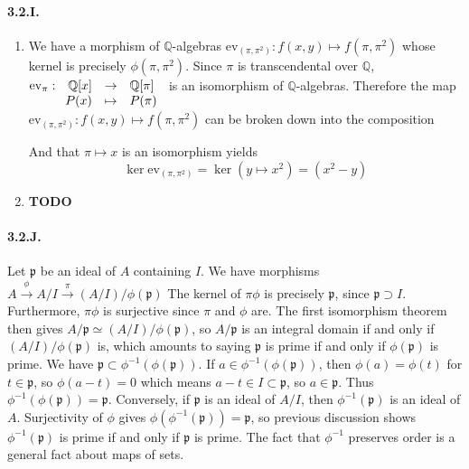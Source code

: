 \documentclass{article}
\newcommand{\ev}{\mathrm{ev}}
\newcommand{\Q}{\mathbb{Q}}
\newcommand{\todo}{\textbf{TODO}}
\newcommand{\applic}[4]{\begin{array}[t]{rcl}
#1 & \to & #2 \\
#3 & \mapsto & #4
\end{array}}
\newcommand{\p}{\mathfrak{p}}
\begin{document}
\paragraph{3.2.I.} 
\begin{enumerate}
    \item We have a morphism of $\Q$-algebras $\mathrm{ev}_{(\pi,\pi^2)} : f(x,y) \mapsto f(\pi,\pi^2)$ whose kernel is precisely $\phi(\pi,\pi^2)$. Since $\pi$ is transcendental over $\Q$, $\mathrm{ev}_\pi : \applic{\Q[x]}{\Q[\pi]}{P(x)}{P(\pi)}$ is an isomorphism of $\Q$-algebras. Therefore the map $\mathrm{ev}_{(\pi,\pi^2)} : f(x,y) \mapsto f(\pi,\pi^2)$ can be broken down into the composition
    \begin{center}
    \end{center}
    And that $\pi \mapsto x$ is an isomorphism yields
    \[\ker \ev_{(\pi,\pi^2)} = \ker (y \mapsto x^2) = (x^2 - y)\]
    \item \todo
\end{enumerate}

\paragraph{3.2.J.} Let $\p$ be an ideal of $A$ containing $I$. We have morphisms
$A \xrightarrow{\phi} A/I \xrightarrow{\pi} (A/I)/\phi(\p)$
The kernel of $\pi\phi$ is precisely $\p$, since $\p \supset I$. Furthermore, $\pi \phi$ is surjective since $\pi$ and $\phi$ are. The first isomorphism theorem then gives $A/\p \simeq (A/I)/\phi(\p)$, so $A/\p$ is an integral domain if and only if $(A/I)/\phi(\p)$ is, which amounts to saying $\p$ is prime if and only if $\phi(\p)$ is prime. We have $\p \subset \phi^{-1}(\phi(\p))$. If $a \in \phi^{-1}(\phi(\p))$, then $\phi(a) = \phi(t)$ for $t \in \p$, so $\phi(a-t) = 0$ which means $a-t \in I \subset \p$, so $a \in \p$. Thus $\phi^{-1}(\phi(\p)) = \p$. Conversely, if $\p$ is an ideal of $A/I$, then $\phi^{-1}(\p)$ is an ideal of $A$. Surjectivity of $\phi$ gives $\phi(\phi^{-1}(\p)) = \p$, so previous discussion shows $\phi^{-1}(\p)$ is prime if and only if $\p$ is prime. The fact that $\phi^{-1}$ preserves order is a general fact about maps of sets.
\end{document}
